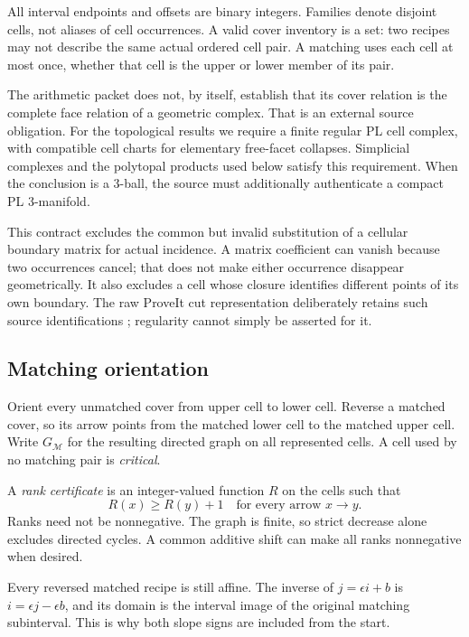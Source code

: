 \documentclass[11pt,letterpaper]{article}
\theoremstyle{definition}
\theoremstyle{remark}\newtheorem{remark}[theorem]{Remark}
\begin{document}
All interval endpoints and offsets are binary integers. Families denote disjoint cells, not aliases of cell occurrences. A valid cover inventory is a set: two recipes may not describe the same actual ordered cell pair. A matching uses each cell at most once, whether that cell is the upper or lower member of its pair.

The arithmetic packet does not, by itself, establish that its cover relation is the complete face relation of a geometric complex. That is an external source obligation. For the topological results we require a finite regular PL cell complex, with compatible cell charts for elementary free-facet collapses. Simplicial complexes and the polytopal products used below satisfy this requirement. When the conclusion is a 3-ball, the source must additionally authenticate a compact PL 3-manifold.

This contract excludes the common but invalid substitution of a cellular boundary matrix for actual incidence. A matrix coefficient can vanish because two occurrences cancel; that does not make either occurrence disappear geometrically. It also excludes a cell whose closure identifies different points of its own boundary. The raw ProveIt cut representation deliberately retains such source identifications \cite{repo-cut}; regularity cannot simply be asserted for it.

\subsection{Matching orientation}

Orient every unmatched cover from upper cell to lower cell. Reverse a matched cover, so its arrow points from the matched lower cell to the matched upper cell. Write $G_{\mathcal M}$ for the resulting directed graph on all represented cells. A cell used by no matching pair is \emph{critical}.

A \emph{rank certificate} is an integer-valued function $R$ on the cells such that
\begin{equation}
                R(x)\geq R(y)+1
        \quad\text{for every arrow }x\longrightarrow y.
 \label{eq:ranking}
\end{equation}
Ranks need not be nonnegative. The graph is finite, so strict decrease alone excludes directed cycles. A common additive shift can make all ranks nonnegative when desired.

Every reversed matched recipe is still affine. The inverse of $j=\epsilon i+b$ is $i=\epsilon j-\epsilon b$, and its domain is the interval image of the original matching subinterval. This is why both slope signs are included from the start.
\end{document}
